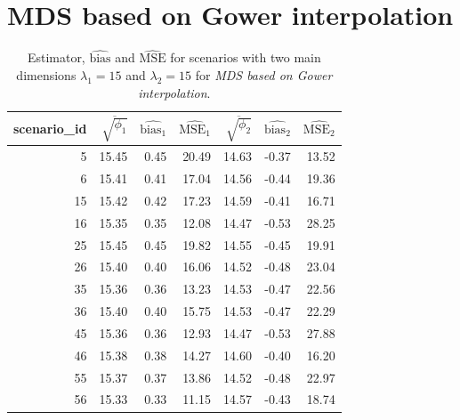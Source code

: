 \documentclass[11pt]{report}
\begin{document}
\FloatBarrier

\section{MDS based on Gower interpolation}
\label{mse_gower}
\begin{table}[ht]
\centering
\begin{tabular}{rrrrrrr}
scenario\_id & $\overline{\sqrt{\phi_1}}$ & $\widehat{\mbox{bias}_1}$ & $\widehat{\mbox{MSE}_1}$ & $\overline{\sqrt{\phi_2}}$ & $\widehat{\mbox{bias}_2}$ & $\widehat{\mbox{MSE}_2}$ \\ 
  \hline
  5 & 15.45 & 0.45 & 20.49 & 14.63 & -0.37 & 13.52 \\ 
  6 & 15.41 & 0.41 & 17.04 & 14.56 & -0.44 & 19.36 \\ 
  15 & 15.42 & 0.42 & 17.23 & 14.59 & -0.41 & 16.71 \\ 
  16 & 15.35 & 0.35 & 12.08 & 14.47 & -0.53 & 28.25 \\ 
  25 & 15.45 & 0.45 & 19.82 & 14.55 & -0.45 & 19.91 \\ 
  26 & 15.40 & 0.40 & 16.06 & 14.52 & -0.48 & 23.04 \\ 
  35 & 15.36 & 0.36 & 13.23 & 14.53 & -0.47 & 22.56 \\ 
  36 & 15.40 & 0.40 & 15.75 & 14.53 & -0.47 & 22.29 \\ 
  45 & 15.36 & 0.36 & 12.93 & 14.47 & -0.53 & 27.88 \\ 
  46 & 15.38 & 0.38 & 14.27 & 14.60 & -0.40 & 16.20 \\ 
  55 & 15.37 & 0.37 & 13.86 & 14.52 & -0.48 & 22.97 \\ 
  56 & 15.33 & 0.33 & 11.15 & 14.57 & -0.43 & 18.74 \\ 
   \hline
\end{tabular}
\caption{Estimator, $\widehat{\mbox{bias}}$ and $\widehat{\mbox{MSE}}$ for scenarios with two main dimensions $\lambda_1 = 15$ and $\lambda_2 = 15$ for \textit{MDS based on Gower interpolation}.}
\end{table}
\end{document}
